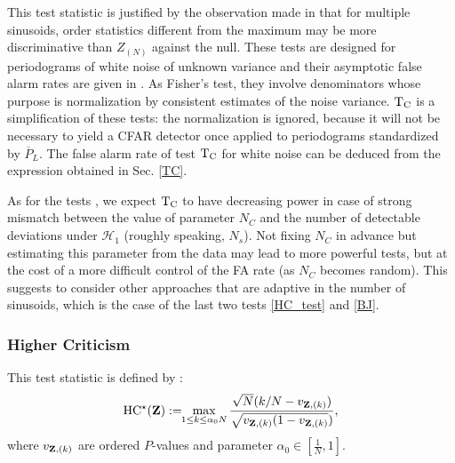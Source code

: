 \documentclass[journal]{IEEEtran}
\begin{document}
This test statistic is justified by the observation made in \cite{Shimshoni_1971,Chiu_1989} that for multiple sinusoids, order statistics
different from the maximum may be more discriminative {than $Z_{(N)}$} against the null. 
These tests are designed for periodograms of white noise of unknown variance and their asymptotic false alarm rates are given in  \cite{Shimshoni_1971,Chiu_1989}.
As Fisher's test, they involve denominators whose purpose is normalization by consistent estimates of the noise variance.
${\rm T_C}$ is a simplification of these tests: the normalization is ignored, because it will not be necessary to yield a CFAR detector
once applied to periodograms standardized by $\overline{P}_L$. The false alarm rate of test  ${\rm T_C}$ for white noise can be deduced from the expression obtained in Sec. \ref{TC}.

As for the tests \cite{Shimshoni_1971,Chiu_1989}, we expect ${\rm T_C}$ to have decreasing power in case of strong mismatch between the value of parameter $N_C$ and the  {  number of detectable deviations under   ${\mathcal{H}}_1$ (roughly speaking, $N_s$)}.
Not fixing $N_C$ in advance but estimating this parameter from the data may lead to more powerful tests, but at the cost of a more difficult control of the FA rate (as $N_C$ becomes random). 
This suggests to consider other approaches that are adaptive in the number of sinusoids, which is the case of the last two tests \eqref{HC_test} and \eqref{BJ}.\\

  \subsubsection{Higher Criticism}
  \label{hc}
{This   test statistic  is defined by  \cite{Donoho_2004}}:
{
 \begin{equation}  
		 { \rm HC^{\star}}({\bf{  Z}}):= \!\!\displaystyle{\max_{1 \le { k \le \alpha_0 N}}  \frac{\sqrt{N}(k /N - v_{{\bf{Z}},( k )})}{\sqrt{v_{{\bf{Z}},(k)}(1-v_{{\bf Z},({ k })}})}},
		\label{HC_test}
\end{equation}	
}
where $v_{{\bf Z},(k)}$ are ordered $P$-values and parameter $\alpha_0\in [\frac{1}{N},1]$.
\end{document}
